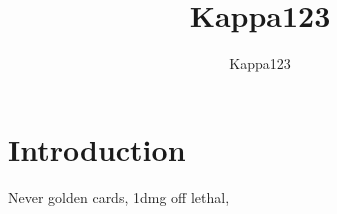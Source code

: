 \documentclass{article}
\title{Kappa123}
\author{Kappa123}
\begin{document}
 





\section{Introduction} Never golden cards, 1dmg off lethal,
\end{document}

